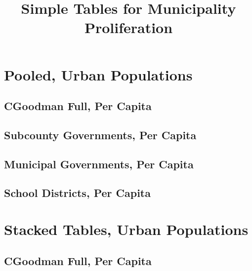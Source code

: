 \documentclass{article}
\title{Simple Tables for Municipality Proliferation}
\begin{document}
\maketitle
\tableofcontents
{\footnotesize 
\listoffigures
\listoftables}
\clearpage

\section{Pooled, Urban Populations}


\subsection{CGoodman Full, Per Capita}


\clearpage

\clearpage


\subsection{Subcounty Governments, Per Capita}


\clearpage

\clearpage


\subsection{Municipal Governments, Per Capita}


\clearpage


\subsection{School Districts, Per Capita}


\clearpage

\clearpage


\section{Stacked Tables, Urban Populations}


\subsection{CGoodman Full, Per Capita}


\clearpage

\clearpage
\end{document}
